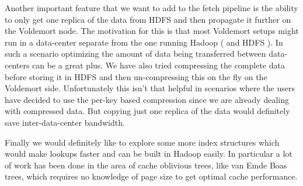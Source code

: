 \documentclass[10pt,twocolumn,preprint,natbib,authoryear]{sigplanconf}
\begin{document}
Another important feature that we want to add to the fetch pipeline is the ability to only get one replica of the data from HDFS and then propagate it further on the Voldemort node. The motivation for this is that most Voldemort setups might run in a data-center separate from the one running Hadoop ( and HDFS ). In such a scenario optimizing the amount of data being transferred between data-centers can be a great plus. We have also tried compressing the complete data before storing it in HDFS and then un-compressing this on the fly on the Voldemort side. Unfortunately this isn't that helpful in scenarios where the users have decided to use the per-key based compression since we are already dealing with compressed data. But copying just one replica of the data would definitely save inter-data-center bandwidth. 

Finally we would definitely like to explore some more index structures which would make lookups faster and can be built in Hadoop easily. In particular a lot of work has been done in the area of cache oblivious trees, like van Emde Boas trees, which requires no knowledge of page size to get optimal cache performance. 
 
\acks



    
\end{document}
